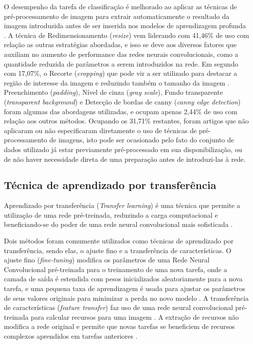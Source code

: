 \documentclass[
	12pt,				%
	oneside,			%
	a4paper,			%
	english,			%
	brazil				%
	]{abntex2ppgsi}
\begin{document}
O desempenho da tarefa de classificação é melhorado ao aplicar as técnicas de pré-processamento de imagem para extrair automaticamente o resultado da imagem introduzida antes de ser inserida nos modelos de aprendizagem profunda \cite{thenmozhi2019crop}. A técnica de Redimensionamento (\textit{resize}) vem liderando com 41,46\% de uso com relação as outras estratégias abordadas, e isso se deve aos diversos fatores que auxiliam no aumento de performance das redes neurais convolucionais, como a quantidade reduzida de parâmetros a serem introduzidos na rede. Em segundo com 17,07\%, o Recorte (\textit{cropping}) que pode vir a ser utilizado para destacar a região de interesse da imagem e reduzindo também o tamanho da imagem \cite{thenmozhi2019crop}. Preenchimento (\textit{padding}), Nível de cinza (\textit{gray scale}), Fundo transparente (\textit{transparent background}) e Detecção de bordas de canny (\textit{canny edge detection}) foram algumas das abordagens utilizadas, e ocupam apenas 2,44\% de uso com relação aos outros métodos. Ocupando os 31,71\% restantes, foram artigos que não aplicaram ou não especificaram diretamente o uso de técnicas de pré-processamento de imagens, isto pode ser ocasionado pelo fato do conjunto de dados utilizado já estar previamente pré-processado em sua disponibilização, ou de não haver necessidade direta de uma preparação antes de introduzi-las à rede.

\subsection{Técnica de aprendizado por transferência}
Aprendizado por transferência (\textit{Transfer learning}) é uma técnica que permite a utilização de uma rede pré-treinada, reduzindo a carga computacional e beneficiando-se do poder de uma rede neural convolucional mais sofisticada \cite{valan2019automated}. 

Dois métodos foram comumente utilizados como técnicas de aprendizado por transferência, sendo elas, o ajuste fino e a transferência de características. O ajuste fino (\textit{fine-tuning}) modifica os parâmetros de uma Rede Neural Convolucional pré-treinada para o treinamento de uma nova tarefa, onde a camada de saída é estendida com pesos inicializados aleatoriamente para a nova tarefa, e uma pequena taxa de aprendizagem é usada para ajustar os parâmetros de seus valores originais para minimizar a perda no novo modelo \cite{li2017learning}. A transferência de características (\textit{feature transfer}) faz uso de uma rede neural convolucional pré-treinada para calcular recursos para uma imagem \cite{li2017learning}. A extração de recursos não modifica a rede original e permite que novas tarefas se beneficiem de recursos complexos aprendidos em tarefas anteriores \cite{li2017learning}.
\end{document}
